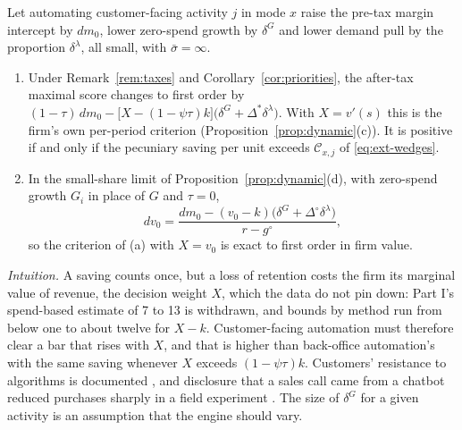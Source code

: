 \begin{proposition}\label{prop:ext-customer}
Let automating customer-facing activity $j$ in mode $x$ raise the pre-tax margin intercept by $dm_0$, lower zero-spend growth by $\delta^G$ and lower demand pull by the proportion $\delta^\lambda$, all small, with $\bar\sigma=\infty$.
\begin{enumerate}
\item[(a)] Under Remark~\ref{rem:taxes} and Corollary~\ref{cor:priorities}, the after-tax maximal score changes to first order by $(1-\tau)\,dm_0-\bigl[X-(1-\psi\tau)k\bigr]\bigl(\delta^G+\Delta^*\delta^\lambda\bigr)$. With $X=v'(s)$ this is the firm's own per-period criterion (Proposition~\ref{prop:dynamic}(c)). It is positive if and only if the pecuniary saving per unit exceeds $\mathcal C_{x,j}$ of \eqref{eq:ext-wedges}.
\item[(b)] In the small-share limit of Proposition~\ref{prop:dynamic}(d), with zero-spend growth $G_i$ in place of $G$ and $\tau=0$,
\begin{equation}\label{eq:ext-dv0}
dv_0=\frac{dm_0-(v_0-k)\bigl(\delta^G+\Delta^\circ\delta^\lambda\bigr)}{r-g^\circ},
\end{equation}
so the criterion of (a) with $X=v_0$ is exact to first order in firm value.
\end{enumerate}
\end{proposition}

\noindent\emph{Intuition.} A saving counts once, but a loss of retention costs the firm its marginal value of revenue, the decision weight $X$, which the data do not pin down: Part I's spend-based estimate of 7 to 13 is withdrawn, and bounds by method run from below one to about twelve for $X-k$. Customer-facing automation must therefore clear a bar that rises with $X$, and that is higher than back-office automation's with the same saving whenever $X$ exceeds $(1-\psi\tau)k$. Customers' resistance to algorithms is documented \citep{dietvorst2015algorithm,longoni2019resistance}, and disclosure that a sales call came from a chatbot reduced purchases sharply in a field experiment \citep{luo2019machines}. The size of $\delta^G$ for a given activity is an assumption that the engine should vary.

